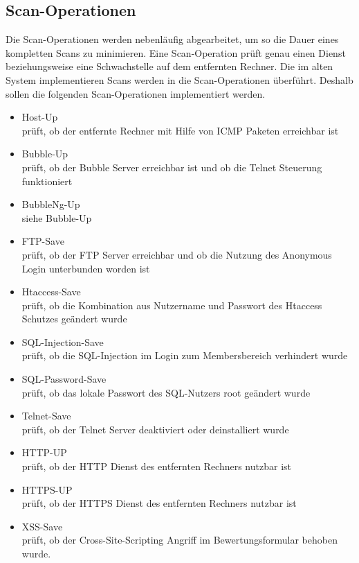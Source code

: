 \subsection{Scan-Operationen}

Die Scan-Operationen werden nebenläufig abgearbeitet, um so die Dauer eines kompletten Scans zu minimieren. Eine Scan-Operation prüft genau einen Dienst beziehungsweise eine Schwachstelle auf dem entfernten Rechner. Die im alten System implementieren Scans werden in die Scan-Operationen überführt. Deshalb sollen die folgenden Scan-Operationen implementiert werden.

\begin{itemize}
	\item Host-Up \\
	prüft, ob der entfernte Rechner mit Hilfe von ICMP Paketen erreichbar ist
	\item Bubble-Up \\
	prüft, ob der Bubble Server erreichbar ist und ob die Telnet Steuerung funktioniert
	\item BubbleNg-Up\\
	siehe Bubble-Up
	\item FTP-Save\\
	prüft, ob der FTP Server erreichbar und ob die Nutzung des Anonymous Login unterbunden worden ist
	\item Htaccess-Save\\
	prüft, ob die Kombination aus Nutzername und Passwort des Htaccess Schutzes geändert wurde
	\item SQL-Injection-Save\\
	prüft, ob die SQL-Injection im Login zum Membersbereich verhindert wurde
	\item SQL-Password-Save\\
	prüft, ob das lokale Passwort des SQL-Nutzers root geändert wurde
	\item Telnet-Save\\
	prüft, ob der Telnet Server deaktiviert oder deinstalliert wurde
	\item HTTP-UP\\
	prüft, ob der HTTP Dienst des entfernten Rechners nutzbar ist
	\item HTTPS-UP\\
	prüft, ob der HTTPS Dienst des entfernten Rechners nutzbar ist
	\item XSS-Save\\
	prüft, ob der Cross-Site-Scripting Angriff im Bewertungsformular behoben wurde.
\end{itemize}

